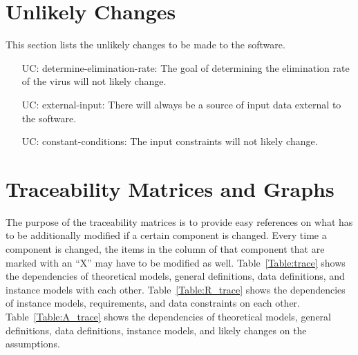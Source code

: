 \documentclass[12pt]{article}
\newcounter{ucnum} %
\begin{document}
\section{Unlikely Changes}    

This section lists the unlikely changes to be made to the software.

\begin{itemize}

\item[UC\refstepcounter{ucnum}\theucnum\label{ULC_determine-elimination-rate}:] 
determine-elimination-rate: The goal of determining the elimination rate of the 
virus will not likely change.

\item[UC\refstepcounter{ucnum}\theucnum\label{ULC_external-input}:] 
external-input: There will always be a source of input data external to the 
software.

\item[UC\refstepcounter{ucnum}\theucnum\label{ULC_constant-conditions}:] 
constant-conditions: The input constraints will not likely change.
\end{itemize}

\section{Traceability Matrices and Graphs}

The purpose of the traceability matrices is to provide easy references on what
has to be additionally modified if a certain component is changed.  Every time a
component is changed, the items in the column of that component that are marked
with an ``X'' may have to be modified as well.  Table~\ref{Table:trace} shows 
the
dependencies of theoretical models, general definitions, data definitions, and
instance models with each other. Table~\ref{Table:R_trace} shows the
dependencies of instance models, requirements, and data constraints on each
other. Table~\ref{Table:A_trace} shows the dependencies of theoretical models,
general definitions, data definitions, instance models, and likely changes on
the assumptions.
\end{document}
